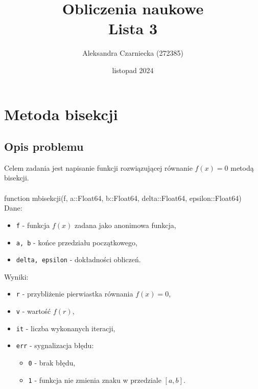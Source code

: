 \documentclass{article}
\title{\textbf{Obliczenia naukowe \\ \large Lista 3}}
\author{Aleksandra Czarniecka (272385)}
\date{listopad 2024}
\begin{document}
\maketitle

\section{Metoda bisekcji}
\subsection{Opis problemu}
Celem zadania jest napisanie funkcji rozwiązującej równanie $f(x) = 0$ metodą bisekcji.\\
\\ function mbisekcji(f, a::Float64, b::Float64, delta::Float64, epsilon::Float64)
\\ Dane:
\begin{itemize}
    \item \texttt{f} - funkcja $f(x)$ zadana jako anonimowa funkcja,
    \item \texttt{a, b} - końce przedziału początkowego,
    \item \texttt{delta, epsilon} - dokładności obliczeń.
\end{itemize}
Wyniki:
\begin{itemize}
    \item \texttt{r} - przybliżenie pierwiastka równania $f(x) = 0$,
    \item \texttt{v} - wartość $f(r)$,
    \item \texttt{it} - liczba wykonanych iteracji,
    \item \texttt{err} - sygnalizacja błędu:
    \begin{itemize}[label={}]
        \item \texttt{0} - brak błędu,
        \item \texttt{1} - funkcja nie zmienia znaku w przedziale $[a, b]$.
    \end{itemize}
\end{itemize}
\end{document}
